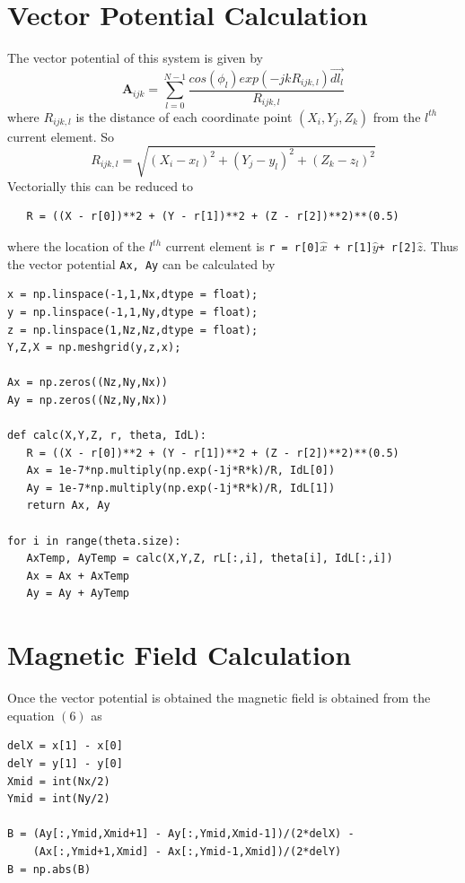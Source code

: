 \documentclass[12pt, a4paper]{report}
\begin{document}
\section*{Vector Potential Calculation}
The vector potential of this system is given by
\begin{equation*}
\mathbf{A}_{ijk} = \sum_{l=0}^{N-1} \frac{cos(\phi_l)exp(-jkR_{ijk,l})\vec{dl_l}}{R_{ijk,l}}
\end{equation*}
where $R_{ijk,l}$ is the distance of each coordinate point $(X_i,Y_j,Z_k)$ from the $l^{th}$ current element. So 
\begin{equation*}
R_{ijk,l} = \sqrt{(X_i - x_l)^2 + (Y_j - y_l)^2 + (Z_k - z_l)^2}
\end{equation*}
Vectorially this can be reduced to
\begin{verbatim}
   R = ((X - r[0])**2 + (Y - r[1])**2 + (Z - r[2])**2)**(0.5)
\end{verbatim}
where the location of the $l^{th}$ current element is \texttt{r = r[0]}$\hat{x}$\texttt{ +  r[1]}$\hat{y}$\texttt{+ r[2]}$\hat{z}$. Thus the vector potential \texttt{Ax, Ay} can be calculated by
\begin{verbatim}
x = np.linspace(-1,1,Nx,dtype = float);
y = np.linspace(-1,1,Ny,dtype = float);
z = np.linspace(1,Nz,Nz,dtype = float);
Y,Z,X = np.meshgrid(y,z,x);

Ax = np.zeros((Nz,Ny,Nx))   
Ay = np.zeros((Nz,Ny,Nx))   

def calc(X,Y,Z, r, theta, IdL):
   R = ((X - r[0])**2 + (Y - r[1])**2 + (Z - r[2])**2)**(0.5)
   Ax = 1e-7*np.multiply(np.exp(-1j*R*k)/R, IdL[0])
   Ay = 1e-7*np.multiply(np.exp(-1j*R*k)/R, IdL[1])
   return Ax, Ay

for i in range(theta.size):
   AxTemp, AyTemp = calc(X,Y,Z, rL[:,i], theta[i], IdL[:,i])
   Ax = Ax + AxTemp
   Ay = Ay + AyTemp 

\end{verbatim}

\clearpage

\section*{Magnetic Field Calculation}

Once the vector potential is obtained the magnetic field is obtained from the equation $(6)$ as

\begin{verbatim}
delX = x[1] - x[0]
delY = y[1] - y[0]
Xmid = int(Nx/2)
Ymid = int(Ny/2)

B = (Ay[:,Ymid,Xmid+1] - Ay[:,Ymid,Xmid-1])/(2*delX) - 
    (Ax[:,Ymid+1,Xmid] - Ax[:,Ymid-1,Xmid])/(2*delY) 
B = np.abs(B)
\end{verbatim}
\end{document}

